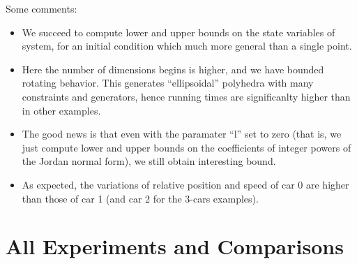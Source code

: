 \documentclass[a4paper,11pt]{article}
\begin{document}
Some comments:
\begin{itemize}
\item We succeed to compute lower and upper bounds on the state
  variables of system, for an initial condition which much more
  general than a single point.
\item Here the number of dimensions begins is higher, and we have
  bounded rotating behavior. This generates ``ellipsoidal''
  polyhedra with many constraints and generators, hence running
  times are significanlty higher than in other examples.
\item The good news is that even with the paramater ``l'' set to
  zero (that is, we just compute lower and upper bounds on the
  coefficients of integer powers of the Jordan normal form), we
  still obtain interesting bound.
\item As expected, the variations of relative position and speed of
  car 0 are higher than those of car 1 (and car 2 for the 3-cars examples).
\end{itemize}


\section{All Experiments and Comparisons}
\label{sec:all}
\end{document}
